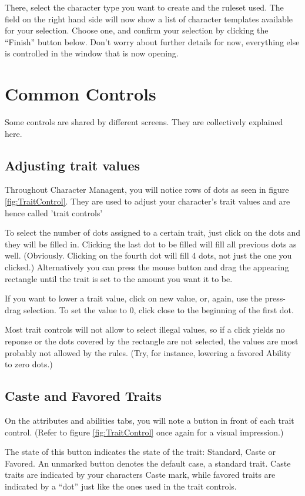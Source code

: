 There, select the character type you want to create and the ruleset used. The field on the right hand side will now show a list of character templates available for your selection. Choose one, and confirm your selection by clicking the "`Finish"' button below. Don't worry about further details for now, everything else is controlled in the window that is now opening.

\section{Common Controls}
Some controls are shared by different screens. They are collectively explained here.

\subsection{Adjusting trait values}
Throughout Character Managent, you will notice rows of dots as seen in figure \ref{fig:TraitControl}. They are used to adjust your character's trait values and are hence called 'trait controls'

To select the number of dots assigned to a certain trait, just click on the dots and they will be filled in. Clicking the last dot to be filled will fill all previous dots as well. (Obviously. Clicking on the fourth dot will fill 4 dots, not just the one you clicked.) Alternatively you can press the mouse button and drag the appearing rectangle until the trait is set to the amount you want it to be. 

If you want to lower a trait value, click on new value, or, again, use the press-drag selection. To set the value to 0, click close to the beginning of the first dot. 

Most trait controls will not allow to select illegal values, so if a click yields no reponse or the dots covered by the rectangle are not selected, the values are most probably not allowed by the rules. (Try, for instance, lowering a favored Ability to zero dots.)

\subsection{Caste and Favored Traits}
On the attributes and abilities tabs, you will note a button in front of each trait control. (Refer to figure \ref{fig:TraitControl} once again for a visual impression.)

The state of this button indicates the state of the trait: Standard, Caste or Favored. An unmarked button denotes the default case, a standard trait. Caste traits are indicated by your characters Caste mark, while favored traits are indicated by a "`dot"' just like the ones used in the trait controls.

